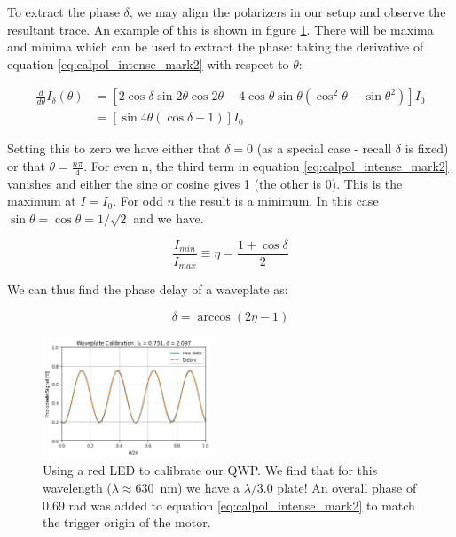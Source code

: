 \documentclass{article}
\begin{document}
To extract the phase $\delta$, we may align the polarizers in our setup and observe the resultant trace. An example of this is shown in figure \ref{fig:cal_wp}. There will be maxima and minima which can be used to extract the phase: taking the derivative of equation \ref{eq:calpol_intense_mark2} with respect to $\theta$:

\begin{align}
    \label{eq:calpolderiv}
    \frac{d}{d\theta}I_{\delta}(\theta) &= \left[2\cos\delta\sin2\theta\cos2\theta-4\cos\theta\sin\theta\left(\cos^2\theta - \sin\theta^2\right)\right]I_0 \nonumber \\
                                        &= \left[\sin4\theta\left(\cos\delta -1\right)\right]I_0
\end{align}

Setting this to zero we have either that $\delta = 0$ (as a special case - recall $\delta$ is fixed) or that $\theta = \frac{n\pi}{4}$. For even n, the third term in equation \ref{eq:calpol_intense_mark2} vanishes and either the sine or cosine gives 1 (the other is 0). This is the maximum at $I=I_0$. For odd $n$ the result is a minimum. In this case $\sin\theta = \cos\theta = 1/\sqrt{2}$ and we have.

\begin{equation}
    \label{eq:calpol_min}
    \frac{I_{min}}{I_{max}} \equiv \eta = \frac{1+\cos\delta}{2}
\end{equation}

We can thus find the phase delay of a waveplate as:

\begin{equation}
    \label{eq:calpol_final}
    \boxed{\delta = \arccos\left(2\eta-1\right)}
\end{equation}


\begin{figure}[h]
    \caption{Using a red LED to calibrate our QWP. We find that for this wavelength ($\lambda \approx 630$~nm) we have a $\lambda/3.0$ plate! An overall phase of 0.69 rad was added to equation \ref{eq:calpol_intense_mark2} to match the trigger origin of the motor.}
    \label{fig:cal_wp}
    \begin{center}
        \includegraphics[width=0.45\textwidth]{wave_plate_cal}
    \end{center}
\end{figure}
\end{document}
